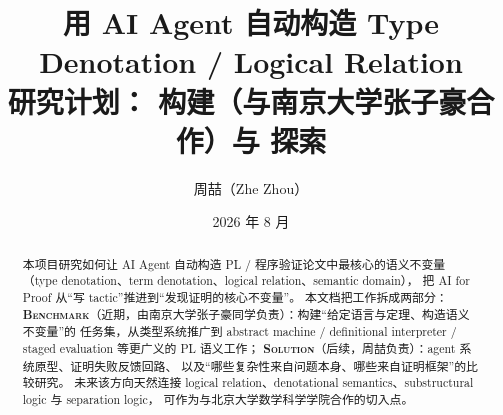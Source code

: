 \documentclass[11pt]{ctexart}
\title{\bfseries 用 AI Agent 自动构造 Type Denotation / Logical Relation\\[6pt]
\large 研究计划：\benchmark{} 构建（与南京大学张子豪合作）与 \solution{} 探索}
\author{周喆（Zhe Zhou）}
\date{2026 年 8 月}
\theoremstyle{plain}
\theoremstyle{remark}
\newcommand{\benchmark}{\textsc{Benchmark}}
\newcommand{\solution}{\textsc{Solution}}
\begin{document}
\maketitle

\begin{abstract}
\noindent
本项目研究如何让 AI Agent 自动构造 PL / 程序验证论文中最核心的语义不变量
（type denotation、term denotation、logical relation、semantic domain），
把 AI for Proof 从``写 tactic''推进到``发现证明的核心不变量''。
本文档把工作拆成两部分：
\textbf{\benchmark{}}（近期，由南京大学张子豪同学负责）：构建``给定语言与定理、构造语义不变量''的
任务集，从类型系统推广到 abstract machine / definitional interpreter / staged evaluation 等更广义的 PL 语义工作；
\textbf{\solution{}}（后续，周喆负责）：agent 系统原型、证明失败反馈回路、
以及``哪些复杂性来自问题本身、哪些来自证明框架''的比较研究。
未来该方向天然连接 logical relation、denotational semantics、substructural logic 与 separation logic，
可作为与北京大学数学科学学院合作的切入点。
\end{abstract}

\tableofcontents









\end{document}
